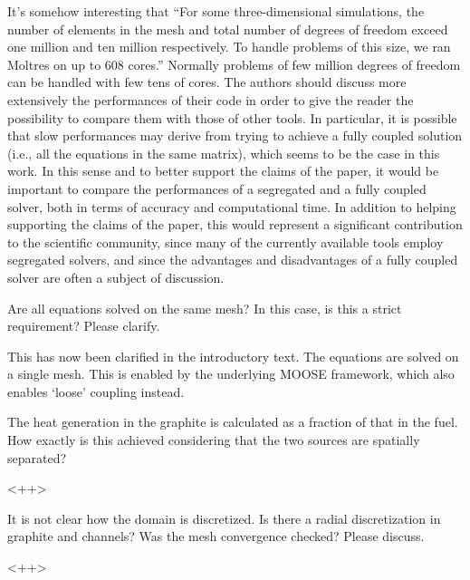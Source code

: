 \documentclass[answers,11pt]{exam}
\begin{document}
\begin{questions}
\question It's somehow interesting that ``For some three-dimensional
simulations, the number of elements in the mesh and total number of degrees of
freedom exceed one million and ten million respectively. To handle problems of
this size, we ran Moltres on up to 608 cores.'' Normally problems of few million
degrees of freedom can be handled with few tens of cores. The authors should
discuss more extensively the performances of their code in order to give the
reader the possibility to compare them with those of other tools. In particular,
it is possible that slow performances may derive from trying to achieve a fully
coupled solution (i.e., all the equations in the same matrix), which seems to be
the case in this work. In this sense and to better support the claims of the
paper, it would be important to compare the performances of a segregated and a
fully coupled solver, both in terms of accuracy and computational time. In
addition to helping supporting the claims of the paper, this would represent a
significant contribution to the scientific community, since many of the
currently available tools employ segregated solvers, and since the advantages
and disadvantages of a fully coupled solver are often a subject of discussion.
\begin{solution}

\end{solution}


\question Are all equations solved on the same mesh? In this case, is this a strict requirement? Please clarify.
\begin{solution}
        This has now been clarified in the introductory text. The equations are
        solved on a single mesh. This is enabled by the underlying MOOSE
        framework, which also enables `loose' coupling instead.
\end{solution}

\question The heat generation in the graphite is calculated as a fraction of
that in the fuel. How exactly is this achieved considering that the two sources
are spatially separated?
\begin{solution}
        <++>
\end{solution}

\question It is not clear how the domain is discretized. Is there a radial
discretization in graphite and channels? Was the mesh convergence checked?
Please discuss.
\begin{solution}
       <++>
\end{solution}


\end{questions}
\end{document}
